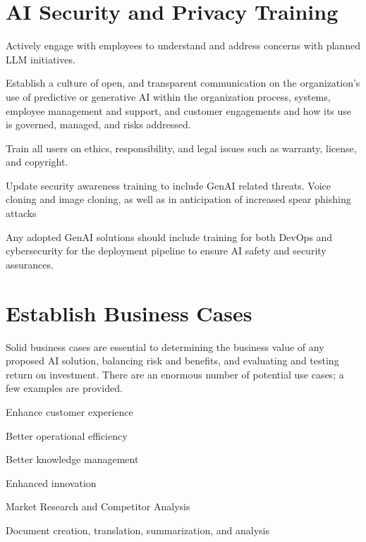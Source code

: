 \section{AI Security and Privacy Training}

\begin{minipage}{\linewidth}
\begin{checklist}
  \item Actively engage with employees to understand and address concerns with
  planned LLM initiatives.
  \item Establish a culture of open, and transparent communication on the
  organization's use of predictive or generative AI within the organization
  process, systems, employee management and support, and customer engagements
  and how its use is governed, managed, and risks addressed.
  \item Train all users on ethics, responsibility, and legal issues such as
  warranty, license, and copyright.
  \item Update security awareness training to include GenAI related threats.
  Voice cloning and image cloning, as well as in anticipation of increased
  spear phishing attacks
  \item Any adopted GenAI solutions should include training for both DevOps
  and cybersecurity for the deployment pipeline to ensure AI safety and
  security assurances.
\end{checklist}
\end{minipage}

\section{Establish Business Cases}
Solid business cases are essential to determining the business value of any
proposed AI solution, balancing risk and benefits, and evaluating and testing
return on investment. There are an enormous number of potential use cases; a
few examples are provided.

\begin{minipage}{\linewidth}
\begin{checklist}
  \item Enhance customer experience
  \item Better operational efficiency
  \item Better knowledge management
  \item Enhanced innovation
  \item Market Research and Competitor Analysis
  \item Document creation, translation, summarization, and analysis
\end{checklist}
\end{minipage}

